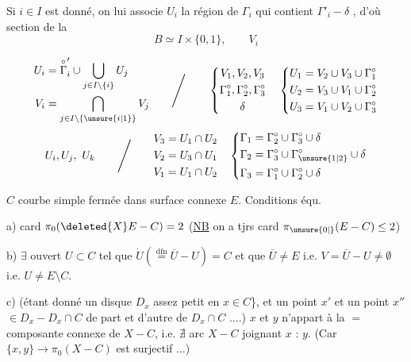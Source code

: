 Si $i\in I$ est donné, on lui associe $U_i$ la région de $\Gamma_i$ qui contient $\Gamma'_i-\delta$ , d'où section de la 
\[
 B\simeq I\times\{0,1\},\qquad V_i
\]

\[
\begin{aligned}
 U_i&=\overset{\circ}{\Gamma}'_i\cup\bigcup_{j\in I\setminus\{i\}}U_j\\
 V_i&=\bigcap_{j\in I\setminus\{\unsure{i|1}\}}V_j
\end{aligned}
\qquad\Bigg/\qquad
\left\{\begin{gathered}
 V_1,V_2,V_3\\ \Gamma_1^\circ,\Gamma_2^\circ,\Gamma_3^\circ\\ \delta
\end{gathered}\right.
\quad
\left\{\begin{aligned}
 U_1&=V_2\cup V_3\cup\Gamma_1^\circ\\
 U_2&=V_3\cup V_1\cup\Gamma_2^\circ\\
 U_3&=V_1\cup V_2\cup\Gamma_3^\circ
\end{aligned}\right.
\]
\[
 U_i,U_j,\ U_k\qquad\Bigg/\qquad
\begin{aligned}
 V_3&=U_1\cap U_2\\
 V_2&=U_3\cap U_1\\
 V_1&=U_1\cap U_2
\end{aligned}
\quad
\left\{\begin{aligned}
 \Gamma_1&=\Gamma_2^\circ\cup\Gamma_3^\circ\cup\delta\\
 \Gamma_2&=\Gamma_3^\circ\cup\Gamma_{\unsure{1|2}}^\circ\cup\delta\\
 \Gamma_3&=\Gamma_1^\circ\cup\Gamma_2^\circ\cup\delta
\end{aligned}\right.
\]

$C$ courbe simple fermée dans surface connexe $E$. Conditions équ.

a) card $\pi_0(\deleted{X}E-C)=2$ \quad (\uline{NB} on a tjrs card $\pi_{\unsure{0|{}}}(E-C)\le 2$)

b) $\exists$ ouvert $U\subset C$ tel que $\dot U(\overset{\text{dfn}}{=}\overline U-U)=C$ et que 
$\overline U\ne E$ i.e. $V=\overline U-U\ne\emptyset$ i.e. $U\ne E\setminus C$.

c) (étant donné un disque $D_x$ assez petit  en $x\in C$\}, et un point $x'$ et un point $x''$ $\in D_x-D_x\cap C$ de part et d'autre de $D_x\cap C$ ....)
$x$ et $y$ n'appart  à la $=$ composante connexe de $X-C$, i.e. $\nexists$ arc  $X-C$ joignant $x$ : $y$.
(Car $\{x,y\}\longrightarrow\pi_0(X-C)$ est surjectif ...)

